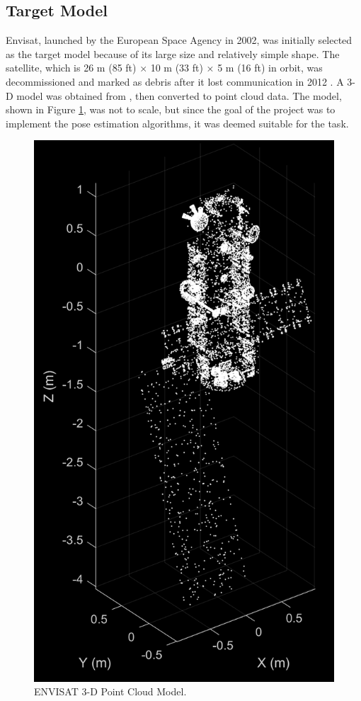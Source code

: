 \documentclass[conference]{IEEEtran}
\begin{document}
	\subsection{Target Model}
		Envisat, launched by the European Space Agency in 2002, was initially selected as the target model because of its large size and relatively simple shape. The satellite, which is 26 m (85 ft) × 10 m (33 ft) × 5 m (16 ft) in orbit, was decommissioned and marked as debris after it lost communication in 2012 \cite{envisat_overview}. A 3-D model was obtained from \cite{envisat_3d_model}, then converted to point cloud data. The model, shown in Figure \ref{3d_model}, was not to scale, but since the goal of the project was to implement the pose estimation algorithms, it was deemed suitable for the task. 
		\begin{figure}[htbp]
			\centerline{\includegraphics[scale=0.8]{Images/point_cloud_model_black_white.PNG}}
			\caption{ENVISAT 3-D Point Cloud Model.}
			\label{3d_model}
		\end{figure}
\end{document}
